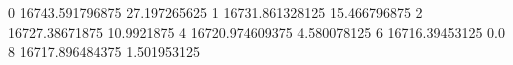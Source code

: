 0 16743.591796875 27.197265625
1 16731.861328125 15.466796875
2 16727.38671875 10.9921875
4 16720.974609375 4.580078125
6 16716.39453125 0.0
8 16717.896484375 1.501953125
